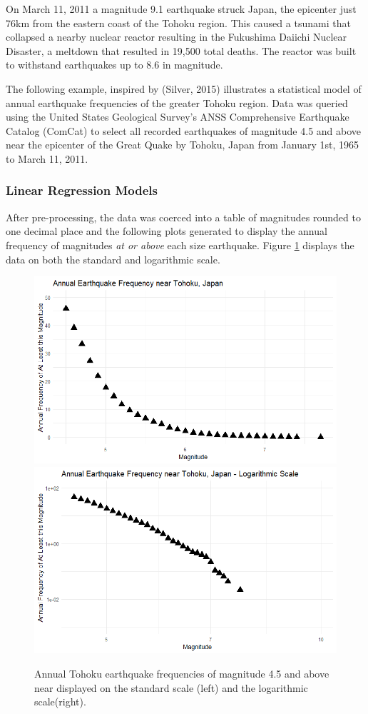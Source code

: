 
On March 11, 2011 a magnitude 9.1 earthquake struck Japan, the epicenter just 76km from the eastern coast of the Tohoku region.  This caused a tsunami that collapsed a nearby nuclear reactor resulting in the Fukushima Daiichi Nuclear Disaster, a meltdown that resulted in 19,500 total deaths.  The reactor was built to withstand earthquakes up to 8.6 in magnitude.

The following example, inspired by (Silver, 2015)\cite{silver2015signal} illustrates a statistical model of annual earthquake frequencies of the greater Tohoku region.
Data was queried using the United States Geological Survey's ANSS Comprehensive Earthquake Catalog (ComCat)
to select all recorded earthquakes of magnitude 4.5 and above near the epicenter of the Great Quake by Tohoku, Japan from January 1st, 1965 to March 11, 2011.



\subsubsection{Linear Regression Models}
After pre-processing, the data was coerced into a table of magnitudes rounded to one decimal place and the following plots generated to display the annual frequency of magnitudes \textit{at or above} each size earthquake.  Figure \ref{tohoku_unfit} displays the data on both the standard and logarithmic scale.

\begin{figure}[H]
    \includegraphics[width=0.5\linewidth]{Figures/tohoku_standardscale.png}
    \includegraphics[width=0.5\linewidth]{Figures/tohoku_logscale.png}
    \caption{\footnotesize{Annual Tohoku earthquake frequencies of magnitude 4.5 and above near displayed on the standard scale (left) and the logarithmic scale(right).}}
    \label{tohoku_unfit}
\end{figure}



